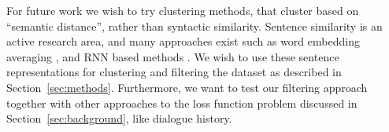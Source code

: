 \documentclass[11pt,a4paper]{article}
\begin{document}
For future work we wish to try clustering methods, that
cluster based on ``semantic distance'', rather than syntactic
similarity. Sentence similarity is an active research area, and many approaches exist
such as word embedding averaging \cite{Arora:2016}, and RNN based methods \cite{Tai:2015}. We wish to use these sentence representations for clustering and filtering the dataset as described in Section~\ref{sec:methods}. Furthermore, we want to test our filtering approach together with
other approaches to the loss function problem discussed in
Section~\ref{sec:background}, like dialogue history.




\end{document}
